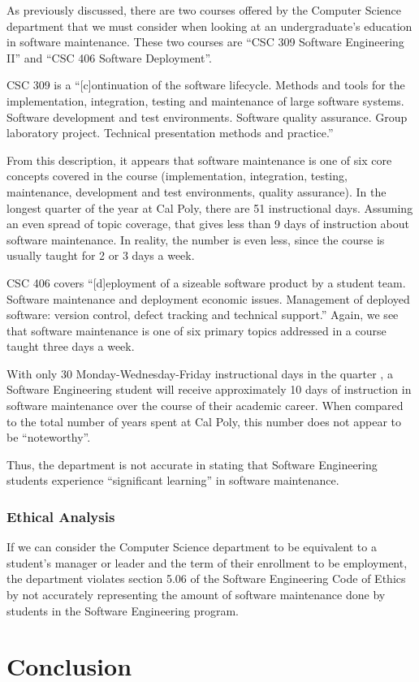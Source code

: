 \documentclass[11pt]{article}
\begin{document}
\begin{multicols}{2}
As previously discussed, there are two courses offered by the Computer Science department that we must consider when looking at an undergraduate's education in software maintenance.  These two courses are ``CSC 309 Software Engineering II'' and ``CSC 406 Software Deployment''.

CSC 309 is a ``[c]ontinuation of the software lifecycle. Methods and tools for the implementation, integration, testing and maintenance of large software systems. Software development and test environments. Software quality assurance. Group laboratory project. Technical presentation methods and practice.'' \cite{catalogCourses}

From this description, it appears that software maintenance is one of six core concepts covered in the course (implementation, integration, testing, maintenance, development and test environments, quality assurance).  In the longest quarter of the year at Cal Poly, there are 51 instructional days. \cite{polyCalendar}  Assuming an even spread of topic coverage, that gives less than 9 days of instruction about software maintenance.  In reality, the number is even less, since the course is usually taught for 2 or 3 days a week. \cite{309Schedule}

CSC 406 covers ``[d]eployment of a sizeable software product by a student team. Software maintenance and deployment economic issues. Management of deployed  software: version control, defect tracking and technical support.'' \cite{catalogCourses}  Again, we see that software maintenance is one of six primary topics addressed in a course taught three days a week. \cite{406Schedule}

With only 30 Monday-Wednesday-Friday instructional days in the quarter \cite{polyCalendar}, a Software Engineering student will receive approximately 10 days of instruction in software maintenance over the course of their academic career.  When compared to the total number of years spent at Cal Poly, this number does not appear to be ``noteworthy''.

Thus, the department is not accurate in stating that Software Engineering students experience ``significant learning'' in software maintenance.

\subsubsection{Ethical Analysis}

If we can consider the Computer Science department to be equivalent to a student's manager or leader and the term of their enrollment to be employment, the department violates section 5.06 of the Software Engineering Code of Ethics by not accurately representing the amount of software maintenance done by students in the Software Engineering program.

\section{Conclusion}

\end{multicols}
\newpage

\nocite{*}




\end{document}
